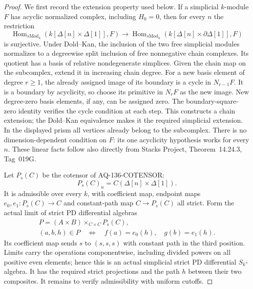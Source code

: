 \begin{proof}
We first record the extension property used below. If a
simplicial $k$-module $F$ has acyclic normalized complex,
including $H_0=0$, then for every $n$ the restriction
\[
 \operatorname{Hom}_{s\mathrm{Mod}_k}
       (k[\Delta[n]\times\Delta[1]],F)
   \longrightarrow
 \operatorname{Hom}_{s\mathrm{Mod}_k}
       (k[\Delta[n]\times\partial\Delta[1]],F)
                                                               \tag{136.CS2}
\]
is surjective. Under Dold--Kan, the inclusion of the two
free simplicial modules normalizes to a degreewise split
inclusion of free nonnegative chain complexes. Its quotient
has a basis of relative nondegenerate simplices.
Given the chain map on the subcomplex, extend it in
increasing chain degree. For a new basis element of degree
$r\ge1$, the already assigned image of its boundary is a
cycle in $N_{r-1}F$. It is a boundary by acyclicity, so
choose its primitive in $N_rF$ as the new image. New
degree-zero basis elements, if any, can be assigned zero.
The boundary-square-zero identity verifies the cycle
condition at each step. This constructs a chain extension;
the Dold--Kan equivalence makes it the required simplicial
extension. In the displayed prism all vertices already
belong to the subcomplex. There is no dimension-dependent
condition on $F$: its one acyclicity hypothesis works for
every $n$. These linear facts follow also directly from
Stacks Project, Theorem~14.24.3, Tag~019G.

Let $P_s(C)$ be the cotensor of AQ-136-COTENSOR:
\[
                P_s(C)_n=C(\Delta[n]\times\Delta[1]).
\]
It is admissible over every $k$, with coefficient map,
endpoint maps $e_0,e_1:P_s(C)\to C$ and constant-path map
$C\to P_s(C)$ all strict. Form the actual limit of strict
PD differential algebras
\[
 \begin{gathered}
        P=(A\times B)\times_{C\times C}P_s(C),\\
 (a,b,h)\in P\quad\Longleftrightarrow\quad
                   f(a)=e_0(h),\quad g(b)=e_1(h).
 \end{gathered}                                            \tag{136.CS3}
\]
Its coefficient map sends $s$ to $(s,s,s)$ with constant
path in the third position. Limits carry the operations
componentwise, including divided powers on all positive
even elements; hence this is an actual simplicial strict
PD differential $S_k$-algebra. It has the required strict
projections and the path $h$ between their two composites.
It remains to verify admissibility with uniform cutoffs.


\end{proof}
